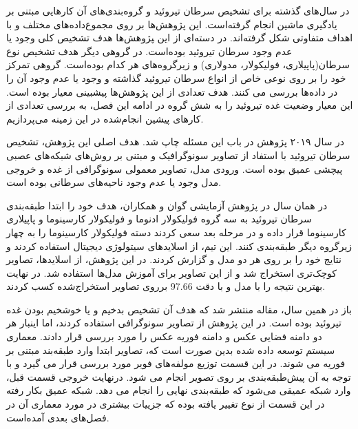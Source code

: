 در سال‌های گذشته برای تشخیص سرطان تیروئید و گروه‌بندی‌های آن‌ کارهایی مبتنی بر یادگیری ماشین انجام گرفته‌است.
این پژوهش‌ها بر روی مجموع‌داده‌های مختلف و با اهداف متفاوتی شکل گرفته‌اند.
در دسته‌ای از این ‍‍پژوهش‌ها هدف تشخیص کلی وجود یا عدم وجود سرطان تیروئید بوده‌است.
در گروهی دیگر هدف تشخیص نوع سرطان(پاپیلاری، فولیکولار، مدولاری) و زیر‌گروه‌های هر کدام بوده‌است.
گروهی تمرکز خود را بر روی نوعی خاص از انواع سرطان تیروئید گذاشته و وجود یا عدم وجود آن را در داده‌ها بررسی می کنند.
هدف تعدادی از این پژوهش‌ها پیشبینی معیار  بوده است. این معیار وضعیت غده تیروئید را به شش گروه 
در ادامه این فصل، به بررسی تعدادی از کارهای پیشین انجام‌شده در این زمینه می‌پردازیم.

در سال ۲۰۱۹ پژوهش \cite{li2019diagnosis} در باب این مسئله چاپ شد.
هدف اصلی این پژوهش، تشخیص سرطان تیروئید با استفاد از تصاویر سونوگرافیک و مبتنی بر روش‌های شبکه‌های عصبی پیچشی عمیق بوده است. ورودی مدل، تصاویر معمولی سونوگرافی از غده و خروجی مدل وجود یا عدم وجود ناحیه‌های سرطانی بوده ‌است.

در همان سال در پژوهش آزمایشی \cite{guan2019deep} گوان و همکاران، هدف خود را ابتدا طبقه‌بندی سرطان تیروئید به سه گروه فولیکولار ادنوما و فولیکولار کارسینوما و پاپیلاری کارسینوما قرار داده و در مرحله بعد سعی کردند دسته فولیکولار کارسینوما را به چهار زیر‌گروه دیگر طبقه‌بندی کنند. این تیم، از اسلاید‌های سیتولوژی دیجیتال استفاده کردند و نتایج خود را بر روی هر دو مدل  و  گزارش کردند.
در این پژوهش، از اسلاید‌ها، تصاویر کوچک‌تری استخراج شد و از این تصاویر برای آموزش مدل‌ها استفاده شد. 
در نهایت بهترین نتیجه را با مدل  و با دقت 97.66 برروی تصاویر استخراج‌شده کسب کردند.

باز در همین سال، مقاله \cite{nguyen2019artificial} منتشر شد که هدف آن تشخیص بد‌خیم و یا خوشخیم بودن غده تیروئید بوده است.
در این پژوهش از تصاویر سونوگرافی استفاده کردند، اما اینبار هر دو دامنه فضایی عکس و دامنه فوریه عکس را مورد بررسی قرار دادند.
معماری سیستم توسعه داده شده بدین صورت است که، تصاویر ابتدا وارد طبقه‌بند مبتنی بر فوریه می شوند.
در این قسمت توزیع مولفه‌های فویر مورد بررسی قرار می گیرد و با توجه به آن پیش‌طبقه‌بندی بر روی تصویر انجام می شود.
درنهایت خروجی قسمت قبل، وارد شبکه عمیقی می‌شود که طبقه‌بندی نهایی را انجام می دهد.
شبکه عمیق بکار رفته در این قسمت از نوع  تغییر یافته بوده که جزییات بیشتری در مورد معماری آن در فصل‌های بعدی آمده‌است.

